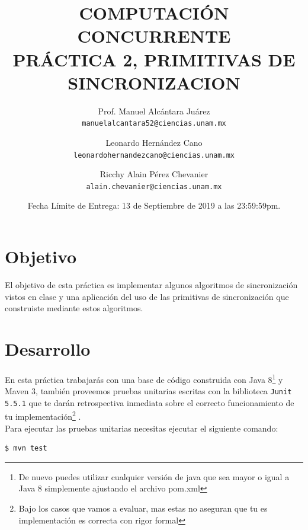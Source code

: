 \documentclass[a4paper,11pt]{article}
\begin{document}
    \title{COMPUTACIÓN CONCURRENTE \\ { PRÁCTICA 2, PRIMITIVAS DE SINCRONIZACION}}
    \author{
    	Prof. Manuel Alcántara Juárez \\
    	\texttt{manuelalcantara52@ciencias.unam.mx}
    	\and
    	Leonardo Hernández Cano \\
    	\texttt{leonardohernandezcano@ciencias.unam.mx}
    	\and
    	Ricchy Alain Pérez Chevanier \\
    	\texttt{alain.chevanier@ciencias.unam.mx}}
    \date{Fecha Límite de Entrega: 13 de Septiembre de 2019 a las 23:59:59pm.}
    
	\maketitle
	\pagestyle{fancy}

	\fancyhf{}
	\fancyfoot[c]{\thepage}
	
	\section{Objetivo}
	El objetivo de esta práctica es implementar algunos algoritmos de sincronización vistos en clase y una aplicación del uso de las primitivas de sincronización que construiste mediante estos algoritmos.
	
	\section{Desarrollo}
	En esta práctica trabajarás con una base de código construida con Java 8\footnote{De nuevo puedes utilizar cualquier versión de java que sea mayor o igual a Java 8 simplemente ajustando el archivo pom.xml}  y Maven 3, también proveemos pruebas unitarias escritas con la biblioteca \verb|Junit 5.5.1| que te darán retrospectiva inmediata sobre el correcto funcionamiento de tu implementación\footnote{Bajo los casos que vamos a evaluar, mas estas no aseguran que tu es implementación es correcta con rigor formal} . \\
	Para ejecutar las pruebas unitarias necesitas ejecutar el siguiente comando: \\
	
	\begin{tcolorbox}
		\begin{lstlisting}
$ mvn test
		\end{lstlisting}
	\end{tcolorbox}
\end{document}
